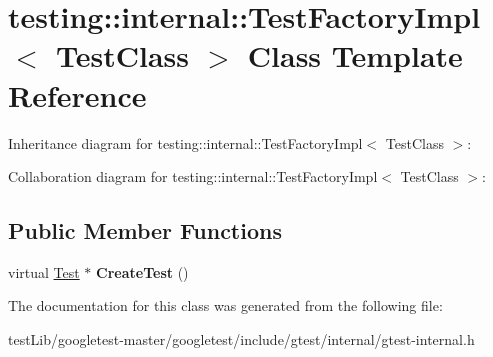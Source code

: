 \hypertarget{classtesting_1_1internal_1_1TestFactoryImpl}{}\section{testing\+:\+:internal\+:\+:Test\+Factory\+Impl$<$ Test\+Class $>$ Class Template Reference}
\label{classtesting_1_1internal_1_1TestFactoryImpl}


Inheritance diagram for testing\+:\+:internal\+:\+:Test\+Factory\+Impl$<$ Test\+Class $>$\+:


Collaboration diagram for testing\+:\+:internal\+:\+:Test\+Factory\+Impl$<$ Test\+Class $>$\+:
\subsection*{Public Member Functions}
\begin{DoxyCompactItemize}
\item 
\mbox{\label{classtesting_1_1internal_1_1TestFactoryImpl_a8860c89bdb06450a5d5e8137ebd9d775}} 
virtual \hyperlink{classtesting_1_1Test}{Test} $\ast$ {\bfseries Create\+Test} ()
\end{DoxyCompactItemize}


The documentation for this class was generated from the following file\+:\begin{DoxyCompactItemize}
\item 
test\+Lib/googletest-\/master/googletest/include/gtest/internal/gtest-\/internal.\+h\end{DoxyCompactItemize}
